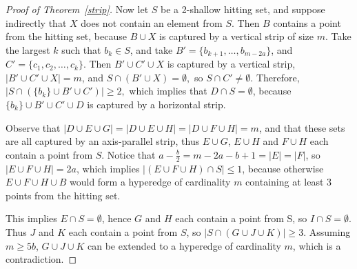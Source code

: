 \documentclass[11pt,oneside]{amsart}
\newcommand{\est}{\emptyset}
\begin{document}
\begin{proof}[Proof of Theorem~\ref{strip}]
Now let $S$ be a 2-shallow hitting set, and suppose indirectly that $X$ does not contain an element from $S$. Then $B$ contains a point from the hitting set, because $B\cup X$ is captured by a vertical strip of size $m$. Take the largest $k$ such that $b_{k}\in S$, and take $B'=\{b_{k+1},\ldots,b_{m-2a}\}$, and $C'=\{c_1,c_2,\ldots,c_k\}$. Then $B'\cup C'\cup X$ is captured by a vertical strip, $|B'\cup C'\cup X|=m$, and $S\cap(B'\cup X)=\emptyset,$ so $S\cap C'\ne \emptyset$. Therefore, $|S\cap(\{b_k\}\cup B'\cup C')|\ge 2,$ which implies that $D\cap S=\emptyset$, because $\{b_k\}\cup B'\cup C'\cup D$ is captured by a horizontal strip.

Observe that $|D\cup E\cup G|=|D\cup E\cup H|=|D\cup F\cup H|=m$, and that these sets are all captured by an axis-parallel strip, thus $E \cup G$, $E \cup H$ and $F \cup H$ each contain a point from $S$. Notice that $a-\frac{b}{2}=m-2a-b+1=|E|=|F|$, so $|E\cup F\cup H|=2a$, which implies $\big|(E\cup F\cup H)\cap S\big|\le 1$, because otherwise $E \cup F \cup H \cup B$ would form a hyperedge of cardinality $m$ containing at least 3 points from the hitting set.



 This implies $E\cap S=\emptyset$, hence $G$ and $H$ each contain a point from S, so $I\cap S=\est$. Thus $J$ and $K$ each contain a point from $S$, so $|S\cap(G\cup J\cup K)|\ge3.$ Assuming $m\ge 5b$, $G\cup J\cup K$ can be extended to a hyperedge of cardinality $m$, which is a contradiction.
\end{proof}
\end{document}
